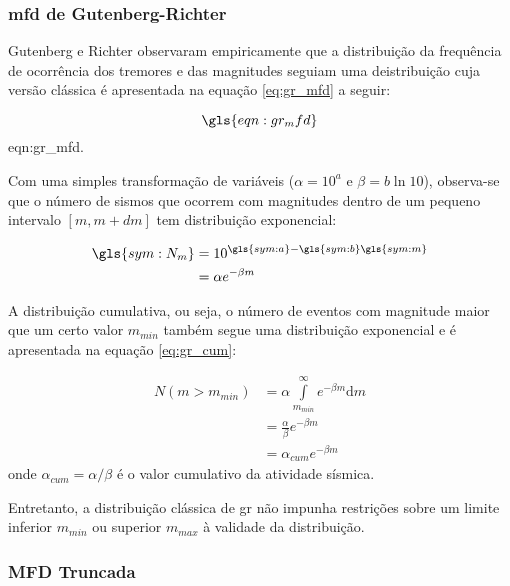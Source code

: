 \subsubsection{\gls{mfd} de Gutenberg-Richter}
\label{sec:grmfd}

Gutenberg e Richter \citep{gr_1954} observaram empiricamente que a distribuição da frequência de ocorrência dos tremores e das
magnitudes seguiam uma deistribuição cuja versão clássica é apresentada na equação \ref{eq:gr_mfd} a seguir:

\begin{equation}
	\gls{eqn:gr_mfd}
	\label{eq:gr_mfd}
\end{equation}
\glsdesc*{eqn:gr_mfd}.

Com uma simples transformação de variáveis ($\alpha = 10^a$ e $\beta = b\ln{10}$), observa-se que o número de sismos que ocorrem 
com magnitudes dentro de um pequeno intervalo $[m, m+dm]$ tem distribuição exponencial:

\begin{equation}
	\begin{split}
		\gls{sym:N_m} &= 10^{\gls{sym:a} - \gls{sym:b}\gls{sym:m}} \\
					  &= \alpha e^{-\beta m}
	\end{split}
	\label{eq:gr_exp}
\end{equation}

A distribuição cumulativa, ou seja, o número de eventos com magnitude maior que um certo valor $m_{min}$ também segue uma
distribuição exponencial e é apresentada na equação \ref{eq:gr_cum}:

\begin{equation}
	\begin{split}
		N(m > m_{min}) &= \alpha \int\limits_{m_{min}}^{\infty}e^{-\beta m}\mathrm{d}m \\
					   &= \frac{\alpha}{\beta} e^{-\beta m} \\
					   &= \alpha_{cum} e^{-\beta m}
	\end{split}
	\label{eq:gr_cum}
\end{equation}
onde $\alpha_{cum} = \alpha / \beta $ é o valor cumulativo da atividade sísmica.


Entretanto, a distribuição clássica de \gls{gr} não impunha restrições sobre um limite inferior $m_{min}$ 
ou superior $m_{max}$ à validade da distribuição.



\subsubsection{MFD Truncada}
\label{sec:TMFD}

